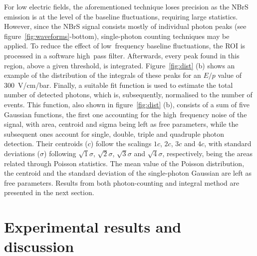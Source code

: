 \documentclass[%
 reprint,
superscriptaddress,
 amsmath,amssymb,
 aps,
]{revtex4-2}
\begin{document}
For low electric fields, the aforementioned technique loses precision as the NBrS emission is at the level of the baseline fluctuations, requiring large statistics. However, since the NBrS signal consists mostly of individual photon peaks (see figure~\ref{fig:waveforms}-bottom), single-photon counting techniques may be applied. To reduce the effect of low~frequency baseline fluctuations, the ROI is processed in a software high~pass filter. Afterwards, every peak found in this region, above a given threshold, is integrated. Figure~\ref{fig:dist} (b) shows an example of the distribution of the integrals of these peaks for an $E/p$ value of 300~V/cm/bar. Finally, a suitable fit function is used to estimate the total number of detected photons, which is, subsequently, normalised to the number of events. This function, also shown in figure~\ref{fig:dist} (b), consists of a sum of five Gaussian functions, the first one accounting for the high~frequency noise of the signal, with area, centroid and sigma being left as free parameters, while the subsequent ones account for single, double, triple and quadruple photon detection. Their centroids ($c$) follow the scalings $1{c}$, $2{c}$, $3{c}$ and $4{c}$, with standard deviations ($\sigma$) following $\sqrt{1}\sigma$, $\sqrt{2}\sigma$, $\sqrt{3}\sigma$ and $\sqrt{4}\sigma$, respectively, being the areas related through Poisson statistics. The mean value of the Poisson distribution, the centroid and the standard deviation of the single-photon Gaussian are left as free parameters.  
Results from both photon-counting and integral method are presented in the next section.

\section{\label{sec:results}Experimental results and discussion}
\end{document}
